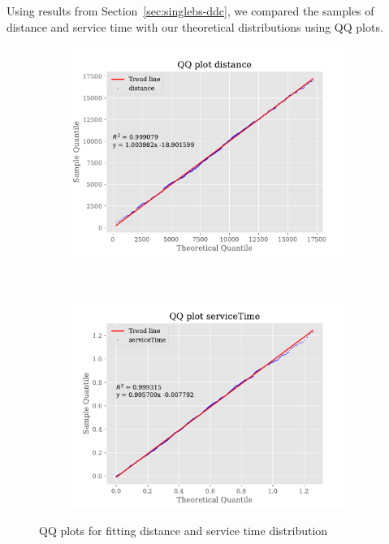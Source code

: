 \documentclass[a4paper,12pt]{article}
\begin{document}
Using results from Section~\ref{sec:singlebs-ddc}, we compared the samples of distance and service time with our theoretical distributions using QQ plots.

\begin{figure}[H]
  \centering
  \begin{subfigure}[b]{0.45\textwidth}
    \centering
    \includegraphics[width=\textwidth]{img/qq-distance.pdf}
    \label{fig:qq-distance}
  \end{subfigure}
  ~
  \begin{subfigure}[b]{0.45\textwidth}
    \centering
    \includegraphics[width=\textwidth]{img/qq-servicetime.pdf}
    \label{fig:qq-servicetime}
  \end{subfigure}
  \caption{QQ plots for fitting distance and service time distribution}
  \label{fig:d}
  \label{fig:qqplots}
\end{figure}
\end{document}
